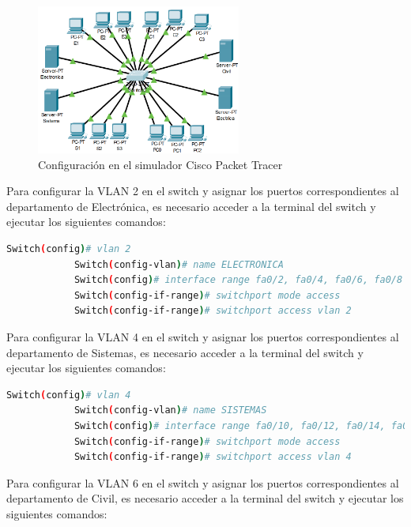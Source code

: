         \begin{figure}[H]
            \centering
            \includegraphics[width=0.6\textwidth]{img/cisco.png}
            \caption{Configuración en el simulador Cisco Packet Tracer}
            \label{fig:cisco}
        \end{figure}

        Para configurar la VLAN 2 en el switch y asignar los puertos correspondientes al departamento de Electrónica, es necesario acceder a la terminal del switch y ejecutar los siguientes comandos:

        \begin{lstlisting}[language=bash, caption={Creación y configuración de la VLAN 2},label={lst:cisco_vlan2}]
            Switch(config)# vlan 2
            Switch(config-vlan)# name ELECTRONICA
            Switch(config)# interface range fa0/2, fa0/4, fa0/6, fa0/8
            Switch(config-if-range)# switchport mode access
            Switch(config-if-range)# switchport access vlan 2
        \end{lstlisting}

        Para configurar la VLAN 4 en el switch y asignar los puertos correspondientes al departamento de Sistemas, es necesario acceder a la terminal del switch y ejecutar los siguientes comandos:

        \begin{lstlisting}[language=bash, caption={Creación y configuración de la VLAN 4},label={lst:cisco_vlan4}]
            Switch(config)# vlan 4
            Switch(config-vlan)# name SISTEMAS
            Switch(config)# interface range fa0/10, fa0/12, fa0/14, fa0/16
            Switch(config-if-range)# switchport mode access
            Switch(config-if-range)# switchport access vlan 4
        \end{lstlisting}

        Para configurar la VLAN 6 en el switch y asignar los puertos correspondientes al departamento de Civil, es necesario acceder a la terminal del switch y ejecutar los siguientes comandos:

